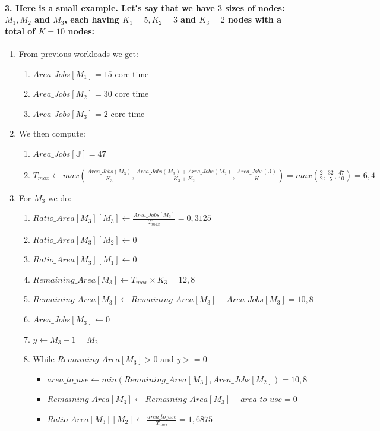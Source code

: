\documentclass[a4paper]{article}
\newcommand{\jobset}{\ensuremath{\mathbb{J}}\xspace}
\begin{document}
\paragraph{3. Here is a small example. Let's say that we have $3$ sizes of nodes: $M_1, M_2$ and $M_3$, each having $K_1 = 5, K_2 = 3$ and $K_3 = 2$ nodes with a total of $K = 10$ nodes:}
\begin{enumerate}
	\item From previous workloads we get:
	\begin{enumerate}
		\item $Area\_Jobs[M_1] = 15$ core time
		\item $Area\_Jobs[M_2] = 30$ core time
		\item $Area\_Jobs[M_3] = 2$ core time
	\end{enumerate}
	\item We then compute:
	\begin{enumerate}
		\item $Area\_Jobs[\jobset] = 47$
		\item $T_{max} \gets max(\frac{Area\_Jobs(M_3)}{K_3}, \frac{Area\_Jobs(M_3) + Area\_Jobs(M_2)}{K_3 + K_2}, \frac{Area\_Jobs(\jobset)}{K}) = max(\frac{2}{2}, \frac{32}{5}, \frac{47}{10}) = 6,4$
	\end{enumerate}
	\item For $M_3$ we do:
	\begin{enumerate}
		\item $Ratio\_Area[M_3][M_3] \gets \frac{Area\_Jobs[M_3]}{T_{max}} = 0,3125$
		\item $Ratio\_Area[M_3][M_2] \gets 0$
		\item $Ratio\_Area[M_3][M_1] \gets 0$
		\item $Remaining\_Area[M_3] \gets T_{max} \times K_3 = 12,8$
		\item $Remaining\_Area[M_3] \gets Remaining\_Area[M_3] - Area\_Jobs[M_3] = 10,8$
		\item $Area\_Jobs[M_3] \gets 0$
		\item $y \gets M_3 - 1 = M_2$
		\item While $Remaining\_Area[M_3]>0$ and $y>=0$
		\begin{itemize}
			\item $area\_to\_use \gets min(Remaining\_Area[M_3], Area\_Jobs[M_2]) = 10,8$
			\item $Remaining\_Area[M_3] \gets Remaining\_Area[M_3] - area\_to\_use = 0$
			\item $Ratio\_Area[M_3][M_2] \gets \frac{area\_to\_use}{T_{max}} = 1,6875$

\end{itemize}
\end{enumerate}
\end{enumerate}
\end{document}
